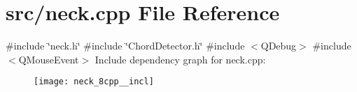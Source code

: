 \section{src/neck.cpp File Reference}
\label{neck_8cpp}
{\ttfamily \#include \char`\"{}neck.\+h\char`\"{}}\newline
{\ttfamily \#include \char`\"{}Chord\+Detector.\+h\char`\"{}}\newline
{\ttfamily \#include $<$Q\+Debug$>$}\newline
{\ttfamily \#include $<$Q\+Mouse\+Event$>$}\newline
Include dependency graph for neck.\+cpp\+:\nopagebreak
\begin{figure}[H]
\begin{center}
\leavevmode
\texttt{[image: neck\_8cpp\_\_incl]}
\end{center}
\end{figure}
